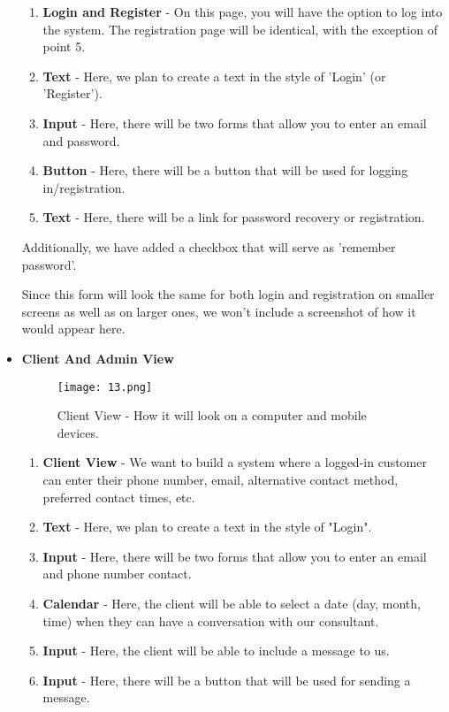 \documentclass{article}
\begin{document}
\begin{itemize}
\begin{enumerate}
    \item \textbf{Login and Register} - On this page, you will have the option to log into the system. The registration page will be identical, with the exception of point 5.
    \item \textbf{Text} - Here, we plan to create a text in the style of 'Login' (or 'Register').
    \item \textbf{Input}  - Here, there will be two forms that allow you to enter an email and password.
    \item \textbf{Button}  - Here, there will be a button that will be used for logging in/registration.
    \item \textbf{Text} - Here, there will be a link for password recovery or registration.
\end{enumerate} 

Additionally, we have added a checkbox that will serve as 'remember password'.

Since this form will look the same for both login and registration on smaller screens as well as on larger ones, we won't include a screenshot of how it would appear here.\par 

    \item \textbf{Client And Admin View} \par

\begin{figure}[h]
    \centering
    \texttt{[image: 13.png]}
    \caption{Client View - How it will look on a computer and mobile devices.}
    \label{fig:enter-label}
\end{figure}

\begin{enumerate}
    \item \textbf{Client View} - We want to build a system where a logged-in customer can enter their phone number, email, alternative contact method, preferred contact times, etc.
    \item \textbf{Text} - Here, we plan to create a text in the style of "Login".
    \item \textbf{Input}  - Here, there will be two forms that allow you to enter an email and phone number contact.
    \item \textbf{Calendar} - Here, the client will be able to select a date (day, month, time) when they can have a conversation with our consultant.
    \item \textbf{Input} - Here, the client will be able to include a message to us.
     \item \textbf{Input} - Here, there will be a button that will be used for sending a message.
\end{enumerate} 


\end{itemize}
\end{document}
